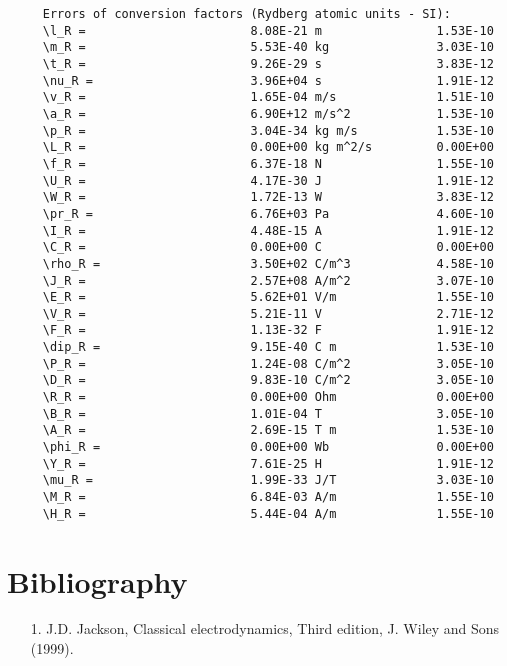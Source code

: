\documentclass[12pt,a4paper]{article}
\begin{document}
\begin{verbatim}
     Errors of conversion factors (Rydberg atomic units - SI):
     \l_R =                       8.08E-21 m                1.53E-10
     \m_R =                       5.53E-40 kg               3.03E-10
     \t_R =                       9.26E-29 s                3.83E-12
     \nu_R =                      3.96E+04 s                1.91E-12
     \v_R =                       1.65E-04 m/s              1.51E-10
     \a_R =                       6.90E+12 m/s^2            1.53E-10
     \p_R =                       3.04E-34 kg m/s           1.53E-10
     \L_R =                       0.00E+00 kg m^2/s         0.00E+00
     \f_R =                       6.37E-18 N                1.55E-10
     \U_R =                       4.17E-30 J                1.91E-12
     \W_R =                       1.72E-13 W                3.83E-12
     \pr_R =                      6.76E+03 Pa               4.60E-10
     \I_R =                       4.48E-15 A                1.91E-12
     \C_R =                       0.00E+00 C                0.00E+00
     \rho_R =                     3.50E+02 C/m^3            4.58E-10
     \J_R =                       2.57E+08 A/m^2            3.07E-10
     \E_R =                       5.62E+01 V/m              1.55E-10
     \V_R =                       5.21E-11 V                2.71E-12
     \F_R =                       1.13E-32 F                1.91E-12
     \dip_R =                     9.15E-40 C m              1.53E-10
     \P_R =                       1.24E-08 C/m^2            3.05E-10
     \D_R =                       9.83E-10 C/m^2            3.05E-10
     \R_R =                       0.00E+00 Ohm              0.00E+00
     \B_R =                       1.01E-04 T                3.05E-10
     \A_R =                       2.69E-15 T m              1.53E-10
     \phi_R =                     0.00E+00 Wb               0.00E+00
     \Y_R =                       7.61E-25 H                1.91E-12
     \mu_R =                      1.99E-33 J/T              3.03E-10
     \M_R =                       6.84E-03 A/m              1.55E-10
     \H_R =                       5.44E-04 A/m              1.55E-10

\end{verbatim}

\newpage


\section{\color{coral}Bibliography}
\begin{enumerate}

\item
[1.] J.D. Jackson, Classical electrodynamics, Third edition,
J. Wiley and Sons (1999).

\end{enumerate}
\end{document}
